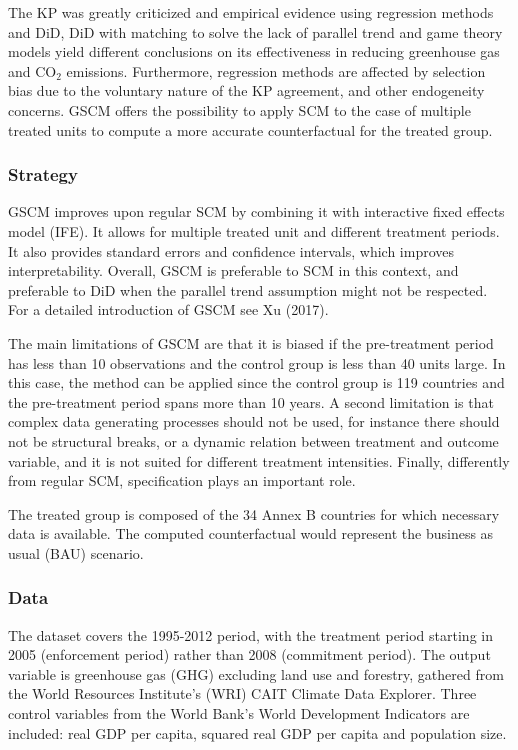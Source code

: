 \documentclass[12pt,a4paper,draft]{article}
\begin{document}
The KP was greatly criticized and empirical evidence using regression methods and DiD, DiD with 
matching to solve the lack of parallel trend and game theory models yield different conclusions 
on its effectiveness in reducing greenhouse gas and CO$_2$ emissions. Furthermore, 
regression methods are affected by selection bias due to the voluntary nature of the KP 
agreement, and other endogeneity concerns. GSCM offers the possibility to apply SCM to the case 
of multiple treated units to compute a more accurate counterfactual for the treated group. 


\subsubsection{Strategy}
GSCM improves upon regular SCM by combining it with interactive fixed effects model (IFE). It 
allows for multiple treated unit and different treatment periods. It also provides standard errors 
and confidence intervals, which improves interpretability. Overall, GSCM is preferable to SCM 
in this context, and preferable to DiD when the parallel trend assumption might not be respected. 
For a detailed introduction of GSCM see Xu (2017).

The main limitations of GSCM are that it is biased if the pre-treatment period has less than 10 
observations and the control group is less than 40 units large. In this case, the method can be 
applied since the control group is 119 countries and the pre-treatment period spans more than 10 
years. A second limitation is that complex data generating processes should not be used, for instance 
there should not be structural breaks, or a dynamic relation between treatment and outcome variable, 
and it is not suited for different treatment intensities. 
Finally, differently from regular SCM, specification plays an important role.

The treated group is composed of the 34 Annex B countries for which necessary data is available. 
The computed counterfactual would represent the business as usual (BAU) scenario. 


\subsubsection{Data}
The dataset covers the 1995-2012 period, with the treatment period starting in 2005 (enforcement 
period) rather than 2008 (commitment period). The output variable is greenhouse gas (GHG) excluding 
land use and forestry, gathered from the World Resources Institute's (WRI) CAIT Climate Data Explorer. 
Three control variables from the World Bank's World Development Indicators are included: real GDP 
per capita, squared real GDP per capita and population size.
\end{document}
